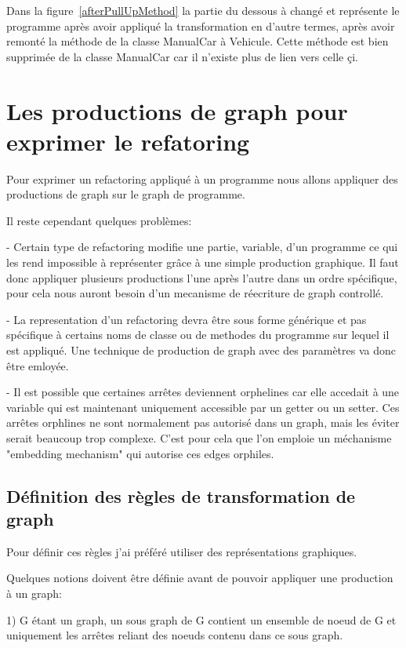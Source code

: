\documentclass[a4paper, 10pt]{article}
\begin{document}
Dans la figure~\ref{afterPullUpMethod} la partie du dessous à changé et représente le programme après avoir appliqué la transformation en d'autre termes, après avoir
remonté la méthode de la classe ManualCar à Vehicule. Cette méthode est bien supprimée de la classe ManualCar car il n'existe plus de lien
vers celle çi.

\section{Les productions de graph pour exprimer le refatoring}

Pour exprimer un refactoring appliqué à un programme nous allons appliquer des productions de graph sur le graph de programme.

Il reste cependant quelques problèmes:

- Certain type de refactoring modifie une partie, variable, d'un programme ce qui les rend impossible à représenter grâce à une simple production graphique. Il faut donc appliquer plusieurs productions l'une après l'autre dans un ordre spécifique, pour cela nous auront besoin d'un mecanisme de réecriture de graph controllé.

- La representation d'un refactoring devra être sous forme générique et pas spécifique à certains noms de classe ou de methodes du programme sur lequel il est appliqué. Une technique de production de graph avec des paramètres va donc être emloyée.

- Il est possible que certaines arrêtes deviennent orphelines car elle accedait à une variable qui est maintenant uniquement accessible par un getter ou un setter. Ces arrêtes orphlines ne sont normalement pas autorisé dans un graph, mais les éviter serait beaucoup trop complexe. C'est pour cela que l'on emploie un méchanisme "embedding mechanism" qui autorise ces edges orphiles.

\subsection{Définition des règles de transformation de graph}

Pour définir ces règles j'ai préféré utiliser des représentations graphiques.

Quelques notions doivent être définie avant de pouvoir appliquer une production à un graph:

1) G étant un graph, un sous graph de G contient un ensemble de noeud de G et uniquement les arrêtes reliant des noeuds contenu dans ce sous graph. 
\end{document}
